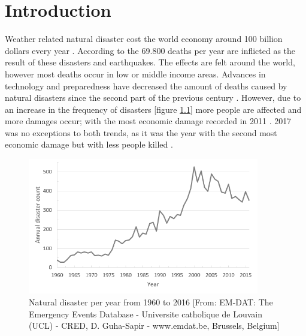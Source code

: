 \chapter{Introduction} \label{intro}

Weather related natural disaster cost the world economy around 100 billion dollars every year \citep{Kousky2014}. According to the \citet{CRED2015} 69.800 deaths per year are inflicted as the result of these disasters and earthquakes. The effects are felt around the world, however most deaths occur in low or middle income areas. Advances in technology and preparedness have decreased the amount of deaths caused by natural disasters since the second part of the previous century \citep{UN2004}. However, due to an increase in the frequency of disasters [figure \ref{fig:graph1}] more people are affected and more damages occur; with the most economic damage recorded in 2011 \citep{Coppola2015, Kerle2015}. 2017 was no exceptions to both trends, as it was the year with the second most economic damage but with less people killed \citep{RE2018}.  

\begin{figure}[h]
	\centering
	\includegraphics[width=0.9\textwidth]{figs/graph2.png}
	\caption{Natural disaster per year from 1960 to 2016 [From:  EM-DAT: The Emergency Events Database - Universite catholique de Louvain (UCL) - CRED, D. Guha-Sapir - www.emdat.be, Brussels, Belgium]}
	\label{fig:graph1}
\end{figure}

